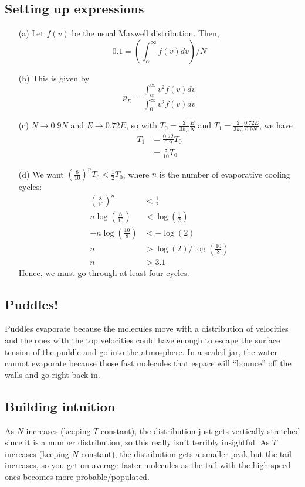 \documentclass{article}
\begin{document}
\subsection{Setting up expressions}

\begin{itemize}
	\item[(a)] Let $f(v)$ be the usual Maxwell distribution. Then,
	\begin{equation}
	0.1 = \left(\int_{\alpha}^{\infty} f(v)dv\right)/N
	\end{equation}
	\item[(b)] This is given by
	\begin{equation}
	p_E = \frac{\int_{\alpha}^{\infty} v^2f(v)dv}{\int_0^{\infty} v^2f(v)dv}
	\end{equation}
	\item[(c)] $N\rightarrow 0.9N$ and $E\rightarrow 0.72E$, so with $T_0 = \frac{2}{3k_B}\frac{E}{N}$ and $T_1 = \frac{2}{3k_B}\frac{0.72E}{0.9N}$, we have
	\begin{align*}
	T_1 &= \frac{0.72}{0.9}T_0 \\
	&= \frac{8}{10}T_0
	\end{align*}
	\item[(d)] We want $\left(\frac{8}{10}\right)^n T_0 < \frac{1}{2}T_0$, where $n$ is the number of evaporative cooling cycles:
	\begin{align*}
	\left(\frac{8}{10}\right)^n &< \frac{1}{2} \\
	n\log\left(\frac{8}{10}\right) &< \log\left(\frac{1}{2}\right) \\
	-n\log\left(\frac{10}{8}\right) &< -\log(2) \\
	n &> \log(2)/\log\left(\frac{10}{8}\right) \\
	n &> 3.1
	\end{align*}
	Hence, we must go through at least four cycles.
\end{itemize}

\subsection{Puddles!}

Puddles evaporate because the molecules move with a distribution of velocities and the ones with the top velocities could have enough to escape the surface tension of the puddle and go into the atmosphere. In a sealed jar, the water cannot evaporate because those fast molecules that espace will ``bounce'' off the walls and go right back in.

\subsection{Building intuition}

As $N$ increases (keeping $T$ constant), the distribution just gets vertically stretched since it is a number distribution, so this really isn't terribly insightful. As $T$ increases (keeping $N$ constant), the distribution gets a smaller peak but the tail increases, so you get on average faster molecules as the tail with the high speed ones becomes more probable/populated.
\end{document}
